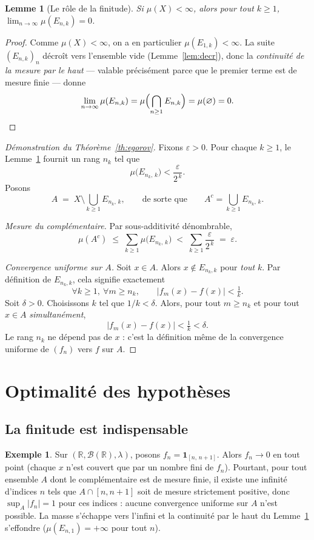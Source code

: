 \documentclass[11pt,a4paper]{article}
\theoremstyle{plain}
\newtheorem{lemme}{Lemme}
\theoremstyle{definition}
\newtheorem{exemple}{Exemple}
\newcommand{\R}{\mathbb{R}}
\newcommand{\1}{\mathbf{1}}
\newcommand{\ind}[1]{\1_{#1}}
\newcommand{\abs}[1]{\left|#1\right|}
\begin{document}
\begin{lemme}[Le rôle de la finitude]\label{lem:fini}
Si $\mu(X)<\infty$, alors pour tout $k\ge1$,
$\displaystyle\lim_{n\to\infty}\mu(E_{n,k})=0$.
\end{lemme}

\begin{proof}
Comme $\mu(X)<\infty$, on a en particulier $\mu(E_{1,k})<\infty$. La suite
$(E_{n,k})_n$ décroît vers l'ensemble vide (Lemme~\ref{lem:decr}), donc la
\emph{continuité de la mesure par le haut} — valable précisément parce que le
premier terme est de mesure finie — donne
\[
  \lim_{n\to\infty}\mu(E_{n,k})
  =\mu\Bigl(\bigcap_{n\ge1}E_{n,k}\Bigr)
  =\mu(\varnothing)=0. \qedhere
\]
\end{proof}

\begin{proof}[Démonstration du Théorème~\ref{th:egorov}]
Fixons $\varepsilon>0$. Pour chaque $k\ge1$, le Lemme~\ref{lem:fini} fournit un
rang $n_k$ tel que
\[
  \mu\bigl(E_{n_k,\,k}\bigr)<\frac{\varepsilon}{2^{\,k}}.
\]
Posons
\[
  A\;=\;X\setminus\bigcup_{k\ge1}E_{n_k,\,k},
  \qquad\text{de sorte que}\qquad
  A^{c}=\bigcup_{k\ge1}E_{n_k,\,k}.
\]

\emph{Mesure du complémentaire.} Par sous-additivité dénombrable,
\[
  \mu(A^{c})\;\le\;\sum_{k\ge1}\mu\bigl(E_{n_k,\,k}\bigr)
  \;<\;\sum_{k\ge1}\frac{\varepsilon}{2^{\,k}}\;=\;\varepsilon.
\]

\emph{Convergence uniforme sur $A$.} Soit $x\in A$. Alors $x\notin E_{n_k,k}$ pour
\emph{tout} $k$. Par définition de $E_{n_k,k}$, cela signifie exactement
\[
  \forall k\ge1,\ \forall m\ge n_k,\qquad \abs{f_m(x)-f(x)}<\tfrac1k .
\]
Soit $\delta>0$. Choisissons $k$ tel que $1/k<\delta$. Alors, pour tout $m\ge n_k$
et pour tout $x\in A$ \emph{simultanément},
\[
  \abs{f_m(x)-f(x)}<\tfrac1k<\delta .
\]
Le rang $n_k$ ne dépend pas de $x$ : c'est la définition même de la convergence
uniforme de $(f_n)$ vers $f$ sur $A$.
\end{proof}

\section{Optimalité des hypothèses}

\subsection*{La finitude est indispensable}

\begin{exemple}\label{ex:masse}
Sur $(\R,\mathcal{B}(\R),\lambda)$, posons $f_n=\ind{[n,\,n+1]}$. Alors $f_n\to 0$
en tout point (chaque $x$ n'est couvert que par un nombre fini de $f_n$).
Pourtant, pour tout ensemble $A$ dont le complémentaire est de mesure finie, il
existe une infinité d'indices $n$ tels que $A\cap[n,n+1]$ soit de mesure
strictement positive, donc $\sup_A\abs{f_n}=1$ pour ces indices : aucune
convergence uniforme sur $A$ n'est possible. La masse s'échappe vers l'infini et
la continuité par le haut du Lemme~\ref{lem:fini} s'effondre ($\mu(E_{n,1})=+\infty$
pour tout $n$).
\end{exemple}
\end{document}
